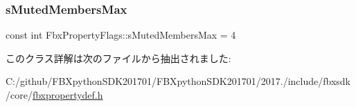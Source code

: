 \mbox{\label{class_fbx_property_flags_a044e37bb3031aa737cf6141d108c77cb}} 
\subsubsection{\texorpdfstring{s\+Muted\+Members\+Max}{sMutedMembersMax}}
{\footnotesize\ttfamily const int Fbx\+Property\+Flags\+::s\+Muted\+Members\+Max = 4\hspace{0.3cm}{\ttfamily [static]}}



このクラス詳解は次のファイルから抽出されました\+:\begin{DoxyCompactItemize}
\item 
C\+:/github/\+F\+B\+Xpython\+S\+D\+K201701/\+F\+B\+Xpython\+S\+D\+K201701/2017./include/fbxsdk/core/\hyperlink{fbxpropertydef_8h}{fbxpropertydef.\+h}\end{DoxyCompactItemize}
